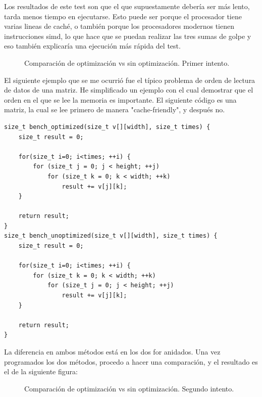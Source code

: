 Los resultados de este test son que el que supuestamente debería ser más lento, tarda menos tiempo en ejecutarse. Esto puede ser porque el procesador tiene varias lineas de caché, o también porque los procesadores modernos tienen instrucciones \gls{simd}, lo que hace que se puedan realizar las tres sumas de golpe y eso también explicaría una ejecución más rápida del test.
\begin{figure}[H]
	\centering
	\caption{Comparación de optimización vs sin optimización. Primer intento.}
\end{figure}

El siguiente ejemplo que se me ocurrió fue el típico problema de orden de lectura de datos de una matriz. He simplificado un ejemplo con el cual demostrar que el orden en el que se lee la memoria es importante. El siguiente código es una matriz, la cual se lee primero de manera "cache-friendly", y después no.
\begin{lstlisting}[style=C-color, caption={Caché optimizada vs sin optimizar. Segundo intento},label=cache-optimization-second]
size_t bench_optimized(size_t v[][width], size_t times) {
	size_t result = 0;
	
	for(size_t i=0; i<times; ++i) {
		for (size_t j = 0; j < height; ++j) 
			for (size_t k = 0; k < width; ++k)
				result += v[j][k];
	}
	
	return result;
}
size_t bench_unoptimized(size_t v[][width], size_t times) {
	size_t result = 0;
	
	for(size_t i=0; i<times; ++i) {
		for (size_t k = 0; k < width; ++k) 
			for (size_t j = 0; j < height; ++j) 
				result += v[j][k];
	}
	
	return result;
}
\end{lstlisting}

La diferencia en ambos métodos está en los dos for anidados. Una vez programados los dos métodos, procedo a hacer una comparación, y el resultado es el de la siguiente figura:
\begin{figure}[H]
	\centering
	\caption{Comparación de optimización vs sin optimización. Segundo intento.}
\end{figure}


